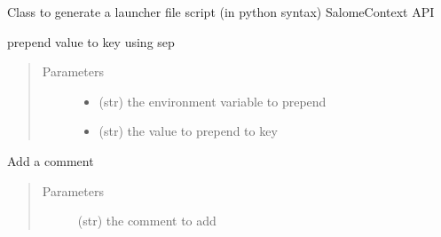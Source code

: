 \documentclass[a4paper,10pt,english]{sphinxmanual}
\begin{document}
\begin{fulllineitems}
\label{\detokenize{apidoc_src/src:src.fileEnviron.LauncherFileEnviron}}
Class to generate a launcher file script 
(in python syntax) SalomeContext API

\begin{fulllineitems}
\label{\detokenize{apidoc_src/src:src.fileEnviron.LauncherFileEnviron.add}}
prepend value to key using sep
\begin{quote}\begin{description}
\item[{Parameters}] \leavevmode\begin{itemize}
\item {} 
 \textendash{} (str) the environment variable to prepend

\item {} 
 \textendash{} (str) the value to prepend to key

\end{itemize}

\end{description}\end{quote}

\end{fulllineitems}


\begin{fulllineitems}
\label{\detokenize{apidoc_src/src:src.fileEnviron.LauncherFileEnviron.add_comment}}
\end{fulllineitems}


\begin{fulllineitems}
\label{\detokenize{apidoc_src/src:src.fileEnviron.LauncherFileEnviron.add_echo}}
Add a comment
\begin{quote}\begin{description}
\item[{Parameters}] \leavevmode
{} \textendash{} (str) the comment to add


\end{description}
\end{quote}
\end{fulllineitems}
\end{fulllineitems}
\end{document}
